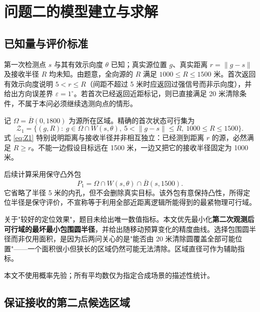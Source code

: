 \section{问题二的模型建立与求解}

\subsection{已知量与评价标准}

第一次检测点 $s$ 与其有效示向度 $\theta$ 已知；真实源位置 $g$、真实距离 $r=\lVert g-s\rVert$ 及接收半径 $R$ 均未知。由题意，全向源的 $R$ 满足 $1000\le R\le1500$ 米。首次返回有效示向度说明 $5<r\le R$（间距不超过 5 米时应返回过强信号而非示向度），并给出方向误差界 $\varepsilon=1^\circ$。若首次已经返回近距标记，则已直接满足 20 米清除条件，不属于本问必须继续选测向点的情形。

记 $\Omega=\overline{B}(0,1800)$ 为源所在区域。精确的首次状态可行集为
\begin{equation}
  \mathcal{Z}_1=\{(g,R):\ g\in\Omega\cap W(s,\theta),\ 5<\lVert g-s\rVert\le R,\ 1000\le R\le1500\}.
  \label{eq:Z1}
\end{equation}
式 \eqref{eq:Z1} 特别说明距离与接收半径并非相互独立：已经测到距离 $r$ 的源，必然满足 $R\ge r$。不能一边假设目标远在 1500 米，一边又把它的接收半径固定为 1000 米。

后续计算采用保守凸外包
\begin{equation}
  P_1=\Omega\cap W(s,\theta)\cap\overline{B}(s,1500).
  \label{eq:P1}
\end{equation}
它省略了半径 5 米的内孔，但不会删除真实目标。该外包有意保持凸性，所得定位半径是保守评价，不宣称等于利用全部近距离逻辑所能得到的最紧物理可行域。

关于"较好的定位效果"，题目未给出唯一数值指标。本文优先最小化\textbf{第二次观测后可行域的最坏最小包围圆半径}，并给出随移动预算变化的精度曲线。选择包围圆半径而非仅用面积，是因为后两问关心的是"能否由 20 米清除圆覆盖全部可能位置"——一个面积很小但狭长的区域仍然可能无法清除。区域直径可作为辅助指标。

本文不使用概率先验；所有平均数仅为指定合成场景的描述性统计。

\subsection{保证接收的第二点候选区域}

